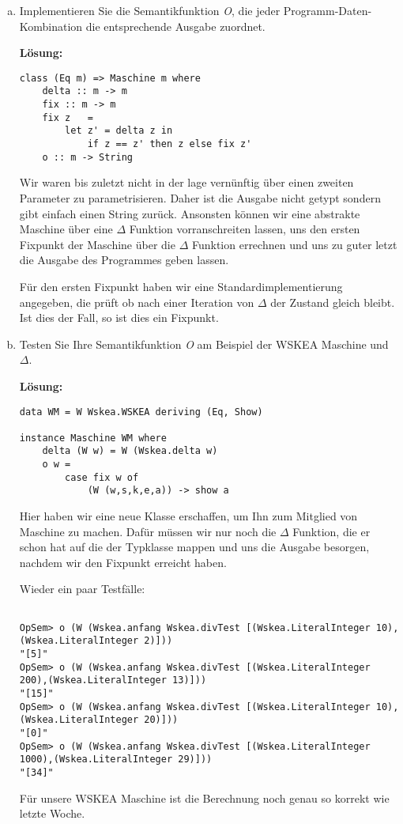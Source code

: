 \documentclass[11pt,a4paper,ngerman]{article}
\begin{document}
\begin{enumerate}[a)]
    \item   Implementieren Sie die Semantikfunktion \emph{O}, die jeder Programm-Daten-Kombination
            die entsprechende Ausgabe zuordnet.

            \textbf{Lösung:}\\
            \begin{lstlisting}
class (Eq m) => Maschine m where
    delta :: m -> m
    fix :: m -> m
    fix z   =
        let z' = delta z in
            if z == z' then z else fix z'
    o :: m -> String
            \end{lstlisting}

            Wir waren bis zuletzt nicht in der lage vernünftig über einen zweiten Parameter zu
            parametrisieren. Daher ist die Ausgabe nicht getypt sondern gibt einfach einen String
            zurück. Ansonsten können wir eine abstrakte Maschine über eine $\Delta$ Funktion
            vorranschreiten lassen, uns den ersten Fixpunkt der Maschine über die $\Delta$ Funktion
            errechnen und uns zu guter letzt die Ausgabe des Programmes geben lassen.

            Für den ersten Fixpunkt haben wir eine Standardimplementierung angegeben, die
            prüft ob nach einer Iteration von $\Delta$ der Zustand gleich bleibt. Ist dies
            der Fall, so ist dies ein Fixpunkt.

    \item   Testen Sie Ihre Semantikfunktion \emph{O} am Beispiel der WSKEA Maschine und $\Delta$.
    
            \textbf{Lösung:}\\
            
            \begin{lstlisting}
data WM = W Wskea.WSKEA deriving (Eq, Show)

instance Maschine WM where
    delta (W w) = W (Wskea.delta w)
    o w =
        case fix w of
            (W (w,s,k,e,a)) -> show a
            \end{lstlisting}
            Hier haben wir eine neue Klasse erschaffen, um Ihn zum Mitglied von Maschine zu machen.
            Dafür müssen wir nur noch die $\Delta$ Funktion, die er schon hat auf die der Typklasse
            mappen und uns die Ausgabe besorgen, nachdem wir den Fixpunkt erreicht haben.

            \pagebreak

            Wieder ein paar Testfälle:
            \begin{lstlisting}

OpSem> o (W (Wskea.anfang Wskea.divTest [(Wskea.LiteralInteger 10),(Wskea.LiteralInteger 2)]))
"[5]"
OpSem> o (W (Wskea.anfang Wskea.divTest [(Wskea.LiteralInteger 200),(Wskea.LiteralInteger 13)]))
"[15]"
OpSem> o (W (Wskea.anfang Wskea.divTest [(Wskea.LiteralInteger 10),(Wskea.LiteralInteger 20)]))
"[0]"
OpSem> o (W (Wskea.anfang Wskea.divTest [(Wskea.LiteralInteger 1000),(Wskea.LiteralInteger 29)]))
"[34]"

            \end{lstlisting}
            Für unsere WSKEA Maschine ist die Berechnung noch genau so korrekt wie letzte Woche. 
\end{enumerate}
\end{document}
